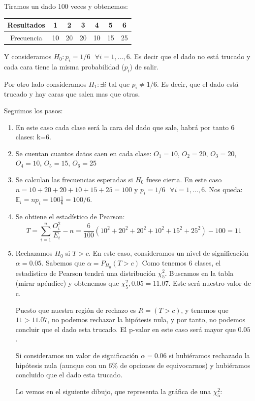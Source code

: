 \documentclass[nochap]{apuntes}
\begin{document}
\begin{example}
Tiramos un dado 100 veces y obtenemos:

\begin{tabular}{|c|c|c|c|c|c|c|}
\hline
Resultados & 1 & 2 & 3 & 4 & 5 & 6 \\
\hline
Frecuencia & 10 & 20 & 20 & 10 & 15 & 25\\
\hline
\end{tabular}

Y consideramos $H_0: p_i=1/6 \text{ } \forall i=1,...,6$. Es decir que el dado no está trucado y cada cara tiene la misma probabilidad ($p_i$) de salir.

Por otro lado consideramos $H_1: \exists i$ tal que $p_i\neq 1/6$. Es decir, que el dado está trucado y hay caras que salen mas que otras.

Seguimos los pasos:
\begin{enumerate}
\item En este caso cada clase será la cara del dado que sale, habrá por tanto 6 clases: k=6.
\item Se cuentan cuantos datos caen en cada clase: $O_1=10$, $O_2=20$, $O_3=20$, $O_4=10$, $O_5=15$, $O_6=25$
\item Se calculan las frecuencias esperadas si $H_0$ fuese cierta. En este caso $n=10+20+20+10+15+25=100$ y $p_i=1/6 \text{ } \forall i=1,...,6$. Nos queda: $\mathbb{E}_i=np_i = 100 \frac{1}{6}=100/6$.
\item Se obtiene el estadístico de Pearson:
\[
T=\sum_{i=1}^n \frac{O_i^2}{E_i}-n = \frac{6}{100}(10^2+20^2+20^2+10^2+15^2+25^2)-100=11
\]
\item Rechazamos $H_0$ si $T>c$. En este caso, consideramos un nivel de significación $\alpha = 0.05$. Sabemos que $\alpha = P_{H_0}(T>c)$ Como tenemos 6 clases, el estadístico de Pearson tendrá una distribución $\chi^2_5$. Buscamos en la tabla (mirar apéndice) y obtenemos que $\chi^2_5, 0.05 = 11.07$. Este será nuestro valor de c.

Puesto que nuestra región de rechazo es $R=(T>c)$, y tenemos que $11>11.07$, no podemos rechazar la hipótesis nula, y por tanto, no podemos concluir que el dado esta trucado. El p-valor en este caso será mayor que $0.05$.

Si consideramos un valor de significación $\alpha = 0.06$ si hubiéramos rechazado la hipótesis nula (aunque con un 6\% de opciones de equivocarnos) y hubiéramos concluido que el dado esta trucado. 

Lo vemos en el siguiente dibujo, que representa la gráfica de una $\chi^2_5$:


\end{enumerate}
\end{example}
\end{document}

